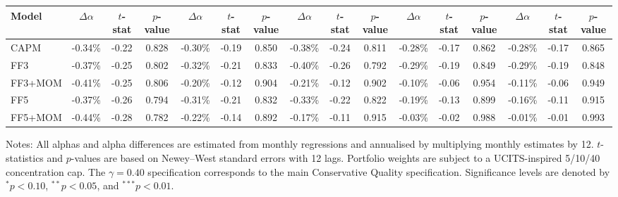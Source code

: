 \begin{table}[H]
\begin{threeparttable}
\begin{tabular*}{\textwidth}{@{\extracolsep{\fill}}lccccccccccccccc}
\cmidrule(lr){2-4} \cmidrule(lr){5-7} \cmidrule(lr){8-10} \cmidrule(lr){11-13} \cmidrule(lr){14-16}
Model & $\Delta\alpha$ & $t$-stat & $p$-value & $\Delta\alpha$ & $t$-stat & $p$-value & $\Delta\alpha$ & $t$-stat & $p$-value & $\Delta\alpha$ & $t$-stat & $p$-value & $\Delta\alpha$ & $t$-stat & $p$-value \\
\midrule
CAPM      & -0.34\% & -0.22 & 0.828 & -0.30\% & -0.19 & 0.850 & -0.38\% & -0.24 & 0.811 & -0.28\% & -0.17 & 0.862 & -0.28\% & -0.17 & 0.865 \\
FF3       & -0.37\% & -0.25 & 0.802 & -0.32\% & -0.21 & 0.833 & -0.40\% & -0.26 & 0.792 & -0.29\% & -0.19 & 0.849 & -0.29\% & -0.19 & 0.848 \\
FF3+MOM   & -0.41\% & -0.25 & 0.806 & -0.20\% & -0.12 & 0.904 & -0.21\% & -0.12 & 0.902 & -0.10\% & -0.06 & 0.954 & -0.11\% & -0.06 & 0.949 \\
FF5       & -0.37\% & -0.26 & 0.794 & -0.31\% & -0.21 & 0.832 & -0.33\% & -0.22 & 0.822 & -0.19\% & -0.13 & 0.899 & -0.16\% & -0.11 & 0.915 \\
FF5+MOM   & -0.44\% & -0.28 & 0.782 & -0.22\% & -0.14 & 0.892 & -0.17\% & -0.11 & 0.915 & -0.03\% & -0.02 & 0.988 & -0.01\% & -0.01 & 0.993 \\
\bottomrule
\end{tabular*}
\begin{tablenotes}[flushleft]
\footnotesize
\item Notes: All alphas and alpha differences are estimated from monthly regressions and annualised by multiplying monthly estimates by 12. $t$-statistics and $p$-values are based on Newey--West standard errors with 12 lags. Portfolio weights are subject to a UCITS-inspired 5/10/40 concentration cap. The $\gamma=0.40$ specification corresponds to the main Conservative Quality specification. Significance levels are denoted by $^{*} p<0.10$, $^{**} p<0.05$, and $^{***} p<0.01$.
\end{tablenotes}
\end{threeparttable}
\end{table}

